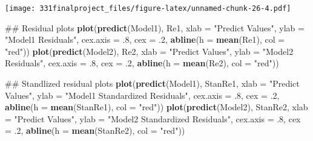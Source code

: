 \documentclass[]{article}
\newenvironment{Shaded}{\begin{snugshade}}{\end{snugshade}}
\newcommand{\KeywordTok}[1]{\textcolor[rgb]{0.13,0.29,0.53}{\textbf{#1}}}
\newcommand{\DataTypeTok}[1]{\textcolor[rgb]{0.13,0.29,0.53}{#1}}
\newcommand{\DecValTok}[1]{\textcolor[rgb]{0.00,0.00,0.81}{#1}}
\newcommand{\StringTok}[1]{\textcolor[rgb]{0.31,0.60,0.02}{#1}}
\newcommand{\NormalTok}[1]{#1}
\begin{document}
\texttt{[image: 331finalproject\_files/figure-latex/unnamed-chunk-26-4.pdf]}

\begin{Shaded}
\begin{Highlighting}[]
\NormalTok{## Residual plots}
\KeywordTok{plot}\NormalTok{(}\KeywordTok{predict}\NormalTok{(Model1), Re1, }\DataTypeTok{xlab =} \StringTok{"Predict Values"}\NormalTok{, }\DataTypeTok{ylab =} \StringTok{"Model1 Residuals"}\NormalTok{, }\DataTypeTok{cex.axis =}\NormalTok{ .}\DecValTok{8}\NormalTok{, }\DataTypeTok{cex =}\NormalTok{ .}\DecValTok{2}\NormalTok{,}
     \KeywordTok{abline}\NormalTok{(}\DataTypeTok{h =} \KeywordTok{mean}\NormalTok{(Re1), }\DataTypeTok{col =} \StringTok{"red"}\NormalTok{))}
\KeywordTok{plot}\NormalTok{(}\KeywordTok{predict}\NormalTok{(Model2), Re2, }\DataTypeTok{xlab =} \StringTok{"Predict Values"}\NormalTok{, }\DataTypeTok{ylab =} \StringTok{"Model2 Residuals"}\NormalTok{, }\DataTypeTok{cex.axis =}\NormalTok{ .}\DecValTok{8}\NormalTok{, }\DataTypeTok{cex =}\NormalTok{ .}\DecValTok{2}\NormalTok{,}
     \KeywordTok{abline}\NormalTok{(}\DataTypeTok{h =} \KeywordTok{mean}\NormalTok{(Re2), }\DataTypeTok{col =} \StringTok{"red"}\NormalTok{))}

\NormalTok{## Standlized residual plots}
\KeywordTok{plot}\NormalTok{(}\KeywordTok{predict}\NormalTok{(Model1), StanRe1, }\DataTypeTok{xlab =} \StringTok{"Predict Values"}\NormalTok{, }\DataTypeTok{ylab =} \StringTok{"Model1 Standardized Residuals"}\NormalTok{, }\DataTypeTok{cex.axis =}\NormalTok{ .}\DecValTok{8}\NormalTok{,}
     \DataTypeTok{cex =}\NormalTok{ .}\DecValTok{2}\NormalTok{, }\KeywordTok{abline}\NormalTok{(}\DataTypeTok{h =} \KeywordTok{mean}\NormalTok{(StanRe1), }\DataTypeTok{col =} \StringTok{"red"}\NormalTok{))}
\KeywordTok{plot}\NormalTok{(}\KeywordTok{predict}\NormalTok{(Model2), StanRe2, }\DataTypeTok{xlab =} \StringTok{"Predict Values"}\NormalTok{, }\DataTypeTok{ylab =} \StringTok{"Model2 Standardized Residuals"}\NormalTok{, }\DataTypeTok{cex.axis =}\NormalTok{ .}\DecValTok{8}\NormalTok{,}
     \DataTypeTok{cex =}\NormalTok{ .}\DecValTok{2}\NormalTok{, }\KeywordTok{abline}\NormalTok{(}\DataTypeTok{h =} \KeywordTok{mean}\NormalTok{(StanRe2), }\DataTypeTok{col =} \StringTok{"red"}\NormalTok{))}


\end{Highlighting}
\end{Shaded}
\end{document}

